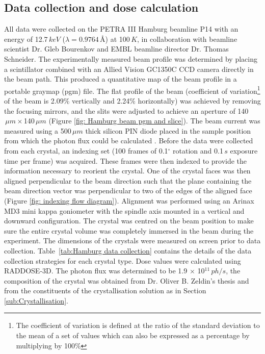 \subsection{Data collection and dose calculation}
\label{sub:Data Collection and Dose Calculation}
All data were collected on the PETRA III Hamburg beamline P14 with an energy of 12.7$\,keV$ ($\lambda = \text{0.9764}\,$\AA) at 100$\,K$, in collaboration with beamline scientist Dr. Gleb Bourenkov and EMBL beamline director Dr. Thomas Schneider.
The experimentally measured beam profile was determined by placing a scintillator combined with an Allied Vision GC1350C CCD camera directly in the beam path.
This produced a quantitative map of the beam profile in a portable graymap (pgm) file.
The flat profile of the beam (coefficient of variation\footnote{The coefficient of variation is defined at the ratio of the standard deviation to the mean of a set of values which can also be expressed as a percentage by multiplying by 100\%} of the beam is 2.09\% vertically and  2.24\% horizontally) was achieved by removing the focusing mirrors, and the slits were adjusted to achieve an aperture of 140$\,\mu m \times $140$\,\mu m$ (Figure \ref{fig: Hamburg beam pgm and slice}).
The beam current was measured using a 500$\,\mu m$ thick silicon PIN diode placed in the sample position from which the photon flux could be calculated \cite{owen2009}.
Before the data were collected from each crystal, an indexing set (100 frames of 0.1$^{\circ}$ rotation and 0.1$\,s$ exposure time per frame) was acquired.
These frames were then indexed to provide the information necessary to reorient the crystal.
One of the crystal faces was then aligned perpendicular to the beam direction such that the plane containing the beam direction vector was perpendicular to two of the edges of the aligned face (Figure \ref{fig: indexing flow diagram}).
Alignment was performed using an Arinax MD3 mini kappa goniometer with the spindle axis mounted in a vertical and downward configuration.
The crystal was centred on the beam position to make sure the entire crystal volume was completely immersed in the beam during the experiment.
The dimensions of the crystals were measured on screen prior to data collection.
Table~\ref{tab:Hamburg data collection} contains the details of the data collection strategies for each crystal type.
Dose values were calculated using RADDOSE-3D.
The photon flux was determined to be 1.9 $\times$ 10$^{\text{11}}\,ph/s$, the composition of the crystal was obtained from Dr. Oliver B. Zeldin's thesis \cite{zeldin2013thesis} and from the constituents of the crystallisation solution as in Section \ref{sub:Crystallisation}.
